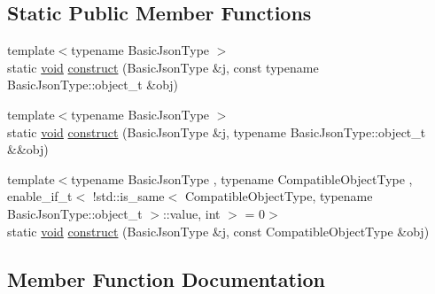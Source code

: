 \subsection*{Static Public Member Functions}
\begin{DoxyCompactItemize}
\item 
{\footnotesize template$<$typename Basic\+Json\+Type $>$ }\\static \hyperlink{namespacenlohmann_1_1detail_a59fca69799f6b9e366710cb9043aa77d}{void} \hyperlink{structnlohmann_1_1detail_1_1external__constructor_3_01value__t_1_1object_01_4_a3a369c5d49596dd4411e368425f9ac7a}{construct} (Basic\+Json\+Type \&j, const typename Basic\+Json\+Type\+::object\+\_\+t \&obj)
\item 
{\footnotesize template$<$typename Basic\+Json\+Type $>$ }\\static \hyperlink{namespacenlohmann_1_1detail_a59fca69799f6b9e366710cb9043aa77d}{void} \hyperlink{structnlohmann_1_1detail_1_1external__constructor_3_01value__t_1_1object_01_4_a1e044961affbd6417386d6e9f1d545e9}{construct} (Basic\+Json\+Type \&j, typename Basic\+Json\+Type\+::object\+\_\+t \&\&obj)
\item 
{\footnotesize template$<$typename Basic\+Json\+Type , typename Compatible\+Object\+Type , enable\+\_\+if\+\_\+t$<$ !std\+::is\+\_\+same$<$ Compatible\+Object\+Type, typename Basic\+Json\+Type\+::object\+\_\+t $>$\+::value, int $>$  = 0$>$ }\\static \hyperlink{namespacenlohmann_1_1detail_a59fca69799f6b9e366710cb9043aa77d}{void} \hyperlink{structnlohmann_1_1detail_1_1external__constructor_3_01value__t_1_1object_01_4_a91f89abe0ec4dec59099b691682ff927}{construct} (Basic\+Json\+Type \&j, const Compatible\+Object\+Type \&obj)
\end{DoxyCompactItemize}


\subsection{Member Function Documentation}

